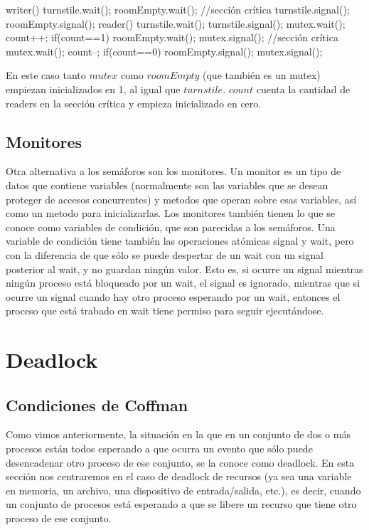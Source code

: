 \documentclass{article}
\begin{document}
\begin{code}
writer()
{
    turnstile.wait();
		    roomEmpty.wait();
				//sección crítica
		turnstile.signal();
		roomEmpty.signal();
}
reader()
{
    turnstile.wait();
		turnstile.signal();
		mutex.wait();
		    count++;
				if(count==1)
				    roomEmpty.wait();
		mutex.signal();
		//sección crítica
		mutex.wait();
		    count--;
				if(count==0)
				    roomEmpty.signal();
	  mutex.signal();
}
\end{code}

En este caso tanto $mutex$ como $roomEmpty$ (que tambi\'en es un mutex) empiezan inicializados en 1, al igual que $turnstile$. $count$ cuenta la cantidad de readers en la secci\'on cr\'itica y empieza inicializado en cero.

\subsection{Monitores}

Otra alternativa a los sem\'aforos son los monitores. Un monitor es un tipo de datos que contiene variables (normalmente son las variables que se desean proteger de accesos concurrentes) y metodos que operan sobre esas variables, as\'i como un metodo para inicializarlas. Los monitores tambi\'en tienen lo que se conoce como variables de condici\'on, que son parecidas a los sem\'aforos. Una variable de condici\'on tiene tambi\'en las operaciones at\'omicas signal y wait, pero con la diferencia de que s\'olo se puede despertar de un wait con un signal posterior al wait, y no guardan ning\'un valor. Esto es, si ocurre un signal mientras ning\'un proceso est\'a bloqueado por un wait, el signal es ignorado, mientras que si ocurre un signal cuando hay otro proceso esperando por un wait, entonces el proceso que est\'a trabado en wait tiene permiso para seguir ejecut\'andose.

\section{Deadlock}

\subsection{Condiciones de Coffman}

Como vimos anteriormente, la situaci\'on en la que en un conjunto de dos o m\'as procesos est\'an todos esperando a que ocurra un evento que s\'olo puede desencadenar otro proceso de ese conjunto, se la conoce como deadlock. En esta secci\'on nos centraremos en el caso de deadlock de recursos (ya sea una variable en memoria, un archivo, una dispositivo de entrada/salida, etc.),  es decir, cuando un conjunto de procesos est\'a esperando a que se libere un recurso que tiene otro proceso de ese conjunto.
\end{document}
